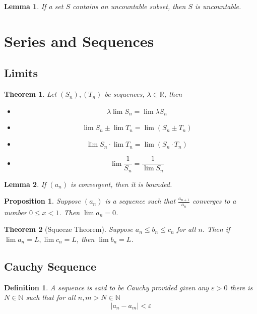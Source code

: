 \documentclass[12pt]{article}
\newtheorem{definition}{Definition}[subsection]
\newtheorem{theorem}{Theorem}[subsection]
\newtheorem{proposition}{Proposition}[subsection]
\newtheorem{lemma}{Lemma}[subsection]
\begin{document}
			\begin{lemma}
				If a set $S$ contains an uncountable subset, then $S$ is uncountable.
			\end{lemma}
			
			
			\section{Series and Sequences}
			\subsection{Limits}
			\begin{theorem} Let $(S_n), (T_n)$ be sequences, $\lambda \in \mathbb{R}$, then
				\begin{itemize}
					\item \[\lambda \lim S_n = \lim \lambda S_n\]
					\item \[\lim S_n \pm \lim T_n = \lim (S_n \pm T_n)\]
					\item \[\lim S_n \cdot \lim T_n = \lim (S_n \cdot T_n)\]
					\item \[\lim \frac{1}{S_n} = \frac{1}{\lim S_n}\]
				\end{itemize}
			\end{theorem}
			
			\begin{lemma}
				If $(a_n)$ is convergent, then it is bounded.
			\end{lemma}
			
			\begin{proposition}
				Suppose $(a_n)$ is a sequence such that $\frac{a_{n+1}}{a_n}$ converges to a number $0 \leq x <1$. Then $\lim a_n = 0$. 
			\end{proposition}
			
			\begin{theorem}[Squeeze Theorem]
				Suppose $a_n \leq b_n \leq c_n$ for all $n$. Then if $\lim a_n = L, \lim c_n = L$, then $\lim b_n = L$.
			\end{theorem}
			
			\subsection{Cauchy Sequence}
			\begin{definition}
				A sequence is said to be Cauchy provided given any $\varepsilon > 0$ there is $N \in \mathbb{N}$ such that for all $n, m > N\in \mathbb{N}$
					\[|a_n - a_m| < \varepsilon\]
			\end{definition}
			
\end{document}

